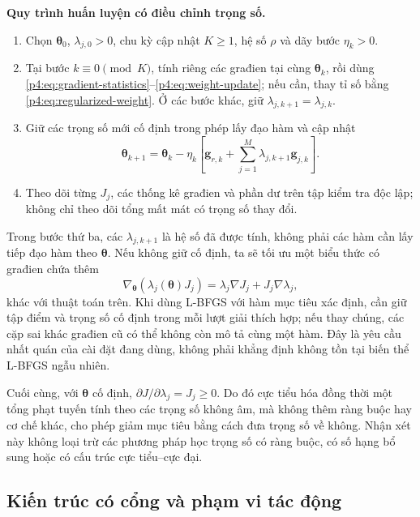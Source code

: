\begin{samepage}
\noindent\textbf{Quy trình huấn luyện có điều chỉnh trọng số.}
\begin{enumerate}[leftmargin=*,label=\arabic*.]
 \item Chọn $\boldsymbol{\theta}_0$, $\lambda_{j,0}>0$, chu kỳ cập nhật
 $K\geq1$, hệ số $\rho$ và dãy bước $\eta_k>0$.
 \item Tại bước $k\equiv0\pmod K$, tính riêng các građien tại
 cùng $\boldsymbol{\theta}_k$, rồi dùng
 \eqref{p4:eq:gradient-statistics}--\eqref{p4:eq:weight-update}; nếu cần,
 thay tỉ số bằng \eqref{p4:eq:regularized-weight}. Ở các bước khác,
 giữ $\lambda_{j,k+1}=\lambda_{j,k}$.
 \item Giữ các trọng số mới cố định trong phép lấy đạo hàm và cập nhật
 \[
  \boldsymbol{\theta}_{k+1}=\boldsymbol{\theta}_k-
  \eta_k\left[\mathbf{g}_{r,k}+\sum_{j=1}^{M}
                         \lambda_{j,k+1}\mathbf{g}_{j,k}\right].
 \]
 \item Theo dõi từng $J_j$, các thống kê građien và phần dư trên tập
 kiểm tra độc lập; không chỉ theo dõi tổng mất mát có trọng số thay đổi.
\end{enumerate}
\end{samepage}

Trong bước thứ ba, các $\lambda_{j,k+1}$ là hệ số đã được tính, không
phải các hàm cần lấy tiếp đạo hàm theo $\boldsymbol{\theta}$. Nếu không
giữ cố định, ta sẽ tối ưu một biểu thức có građien chứa thêm
\begin{equation}
 \nabla_{\boldsymbol{\theta}}(\lambda_j(\boldsymbol{\theta})J_j)
 =\lambda_j\nabla J_j+J_j\nabla\lambda_j,
 \label{p4:eq:weight-derivative}
\end{equation}
khác với thuật toán trên. Khi dùng L-BFGS với hàm mục tiêu xác định,
cần giữ tập điểm và trọng số cố định trong mỗi lượt giải thích hợp;
nếu thay chúng, các cặp sai khác građien cũ có thể không còn mô tả
cùng một hàm. Đây là yêu cầu nhất quán của cài đặt đang dùng, không
phải khẳng định không tồn tại biến thể L-BFGS ngẫu nhiên.

Cuối cùng, với $\boldsymbol{\theta}$ cố định,
$\partial J/\partial\lambda_j=J_j\geq0$.
Do đó cực tiểu hóa đồng thời một tổng phạt tuyến tính theo các trọng
số không âm, mà không thêm ràng buộc hay cơ chế khác, cho phép giảm
mục tiêu bằng cách đưa trọng số về không. Nhận xét này không loại
trừ các phương pháp học trọng số có ràng buộc, có số hạng bổ sung hoặc
có cấu trúc cực tiểu--cực đại.

\subsection{Kiến trúc có cổng và phạm vi tác động}

